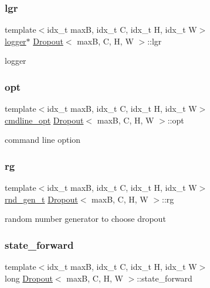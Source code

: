 \subsubsection{\texorpdfstring{lgr}{lgr}}
{\footnotesize\ttfamily template$<$idx\+\_\+t maxB, idx\+\_\+t C, idx\+\_\+t H, idx\+\_\+t W$>$ \\
\hyperlink{structlogger}{logger}$\ast$ \hyperlink{structDropout}{Dropout}$<$ maxB, C, H, W $>$\+::lgr}

logger \mbox{\label{structDropout_a3d9589e177c7fd00af8d7e82db651e48}} 
\subsubsection{\texorpdfstring{opt}{opt}}
{\footnotesize\ttfamily template$<$idx\+\_\+t maxB, idx\+\_\+t C, idx\+\_\+t H, idx\+\_\+t W$>$ \\
\hyperlink{structcmdline__opt}{cmdline\+\_\+opt} \hyperlink{structDropout}{Dropout}$<$ maxB, C, H, W $>$\+::opt}

command line option \mbox{\label{structDropout_a176eb537c9aef161087863244f1e637f}} 
\subsubsection{\texorpdfstring{rg}{rg}}
{\footnotesize\ttfamily template$<$idx\+\_\+t maxB, idx\+\_\+t C, idx\+\_\+t H, idx\+\_\+t W$>$ \\
\hyperlink{structrnd__gen__t}{rnd\+\_\+gen\+\_\+t} \hyperlink{structDropout}{Dropout}$<$ maxB, C, H, W $>$\+::rg}

random number generator to choose dropout \mbox{\label{structDropout_ac409c1b3a996e35eb78964aa52c5a203}} 
\subsubsection{\texorpdfstring{state\+\_\+forward}{state\_forward}}
{\footnotesize\ttfamily template$<$idx\+\_\+t maxB, idx\+\_\+t C, idx\+\_\+t H, idx\+\_\+t W$>$ \\
long \hyperlink{structDropout}{Dropout}$<$ maxB, C, H, W $>$\+::state\+\_\+forward}

